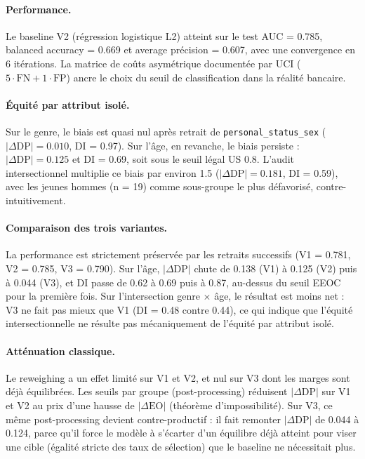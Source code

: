 \documentclass[11pt, a4paper]{article}
\begin{document}
\paragraph{Performance.} Le baseline V2 (régression logistique L2) atteint sur le test AUC = 0.785, balanced accuracy = 0.669 et average précision = 0.607, avec une convergence en 6 itérations. La matrice de coûts asymétrique documentée par UCI ($5 \cdot \text{FN} + 1 \cdot \text{FP}$) ancre le choix du seuil de classification dans la réalité bancaire.

\paragraph{Équité par attribut isolé.} Sur le genre, le biais est quasi nul après retrait de \texttt{personal\_status\_sex} ($|\Delta\text{DP}| = 0.010$, DI = 0.97). Sur l'âge, en revanche, le biais persiste : $|\Delta\text{DP}| = 0.125$ et DI = 0.69, soit sous le seuil légal US 0.8. L'audit intersectionnel multiplie ce biais par environ 1.5 ($|\Delta\text{DP}| = 0.181$, DI = 0.59), avec les jeunes hommes (n = 19) comme sous-groupe le plus défavorisé, contre-intuitivement.

\paragraph{Comparaison des trois variantes.} La performance est strictement préservée par les retraits successifs (V1 = 0.781, V2 = 0.785, V3 = 0.790). Sur l'âge, $|\Delta\text{DP}|$ chute de 0.138 (V1) à 0.125 (V2) puis à 0.044 (V3), et DI passe de 0.62 à 0.69 puis à 0.87, au-dessus du seuil EEOC pour la première fois. Sur l'intersection genre $\times$ âge, le résultat est moins net : V3 ne fait pas mieux que V1 (DI = 0.48 contre 0.44), ce qui indique que l'équité intersectionnelle ne résulte pas mécaniquement de l'équité par attribut isolé.

\paragraph{Atténuation classique.} Le reweighing a un effet limité sur V1 et V2, et nul sur V3 dont les marges sont déjà équilibrées. Les seuils par groupe (post-processing) réduisent $|\Delta\text{DP}|$ sur V1 et V2 au prix d'une hausse de $|\Delta\text{EO}|$ (théorème d'impossibilité). Sur V3, ce même post-processing devient contre-productif : il fait remonter $|\Delta\text{DP}|$ de 0.044 à 0.124, parce qu'il force le modèle à s'écarter d'un équilibre déjà atteint pour viser une cible (égalité stricte des taux de sélection) que le baseline ne nécessitait plus.
\end{document}
